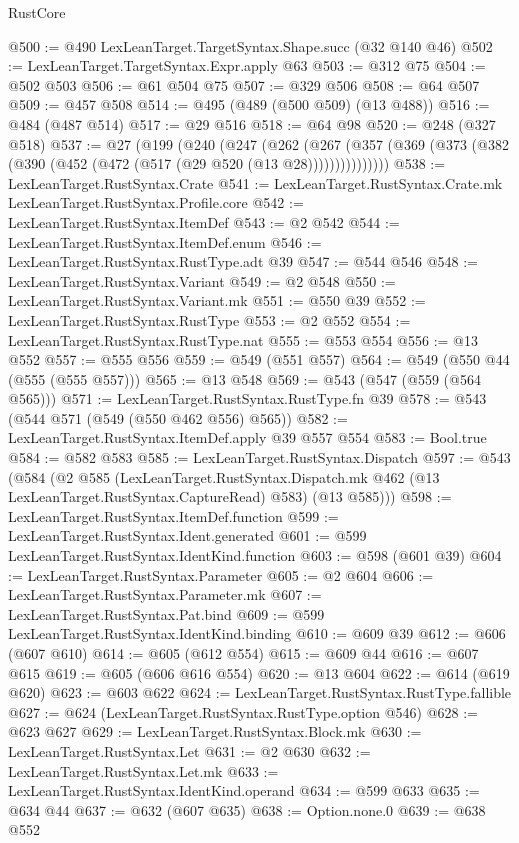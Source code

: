 \begin{lexlean}{RustCore}
\begin{coremodule}
@500 := @490 LexLeanTarget.TargetSyntax.Shape.succ (@32 @140 @46)
@502 := LexLeanTarget.TargetSyntax.Expr.apply @63
@503 := @312 @75
@504 := @502 @503
@506 := @61 @504 @75
@507 := @329 @506
@508 := @64 @507
@509 := @457 @508
@514 := @495 (@489 (@500 @509) (@13 @488))
@516 := @484 (@487 @514)
@517 := @29 @516
@518 := @64 @98
@520 := @248 (@327 @518)
@537 := @27
    (@199
      (@240
        (@247
          (@262
            (@267 (@357 (@369 (@373 (@382 (@390 (@452 (@472 (@517 (@29 @520 (@13 @28)))))))))))))))
@538 := LexLeanTarget.RustSyntax.Crate
@541 := LexLeanTarget.RustSyntax.Crate.mk LexLeanTarget.RustSyntax.Profile.core
@542 := LexLeanTarget.RustSyntax.ItemDef
@543 := @2 @542
@544 := LexLeanTarget.RustSyntax.ItemDef.enum
@546 := LexLeanTarget.RustSyntax.RustType.adt @39
@547 := @544 @546
@548 := LexLeanTarget.RustSyntax.Variant
@549 := @2 @548
@550 := LexLeanTarget.RustSyntax.Variant.mk
@551 := @550 @39
@552 := LexLeanTarget.RustSyntax.RustType
@553 := @2 @552
@554 := LexLeanTarget.RustSyntax.RustType.nat
@555 := @553 @554
@556 := @13 @552
@557 := @555 @556
@559 := @549 (@551 @557)
@564 := @549 (@550 @44 (@555 (@555 @557)))
@565 := @13 @548
@569 := @543 (@547 (@559 (@564 @565)))
@571 := LexLeanTarget.RustSyntax.RustType.fn @39
@578 := @543 (@544 @571 (@549 (@550 @462 @556) @565))
@582 := LexLeanTarget.RustSyntax.ItemDef.apply @39 @557 @554
@583 := Bool.true
@584 := @582 @583
@585 := LexLeanTarget.RustSyntax.Dispatch
@597 := @543
    (@584
      (@2
        @585
        (LexLeanTarget.RustSyntax.Dispatch.mk @462 (@13 LexLeanTarget.RustSyntax.CaptureRead) @583)
        (@13 @585)))
@598 := LexLeanTarget.RustSyntax.ItemDef.function
@599 := LexLeanTarget.RustSyntax.Ident.generated
@601 := @599 LexLeanTarget.RustSyntax.IdentKind.function
@603 := @598 (@601 @39)
@604 := LexLeanTarget.RustSyntax.Parameter
@605 := @2 @604
@606 := LexLeanTarget.RustSyntax.Parameter.mk
@607 := LexLeanTarget.RustSyntax.Pat.bind
@609 := @599 LexLeanTarget.RustSyntax.IdentKind.binding
@610 := @609 @39
@612 := @606 (@607 @610)
@614 := @605 (@612 @554)
@615 := @609 @44
@616 := @607 @615
@619 := @605 (@606 @616 @554)
@620 := @13 @604
@622 := @614 (@619 @620)
@623 := @603 @622
@624 := LexLeanTarget.RustSyntax.RustType.fallible
@627 := @624 (LexLeanTarget.RustSyntax.RustType.option @546)
@628 := @623 @627
@629 := LexLeanTarget.RustSyntax.Block.mk
@630 := LexLeanTarget.RustSyntax.Let
@631 := @2 @630
@632 := LexLeanTarget.RustSyntax.Let.mk
@633 := LexLeanTarget.RustSyntax.IdentKind.operand
@634 := @599 @633
@635 := @634 @44
@637 := @632 (@607 @635)
@638 := Option.none.{0}
@639 := @638 @552

\end{coremodule}
\end{lexlean}
